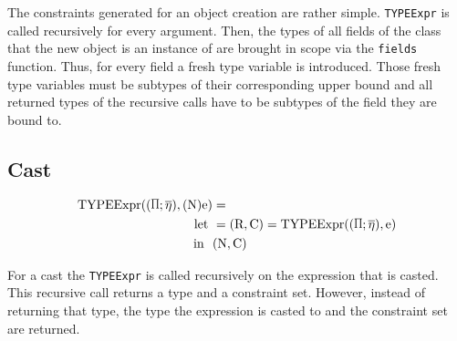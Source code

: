 The constraints generated for an object creation are rather simple. \verb|TYPEExpr| is called recursively for every argument. Then, the types of all
fields of the class that the new object is an instance of are brought in scope via the \verb|fields| function. Thus, for every field a fresh type variable is introduced.
Those fresh type variables must be subtypes of their corresponding upper bound and all returned types of the recursive calls have to be subtypes of the field they are bound to.

\subsection{Cast}

\begin{align*}
    \texpr{(\text{N})\text{e}} &=\\
    \text{let} \ &= (\text{R}, \text{C}) = \texpr{\text{e}}\\
    \text{in} \ \ &(\text{N}, \text{C})
\end{align*}

For a cast the \verb|TYPEExpr| is called recursively on the expression that is casted. This recursive call returns a type and a constraint set. However, instead of returning that type, the type the expression is casted to and the constraint set are returned.
